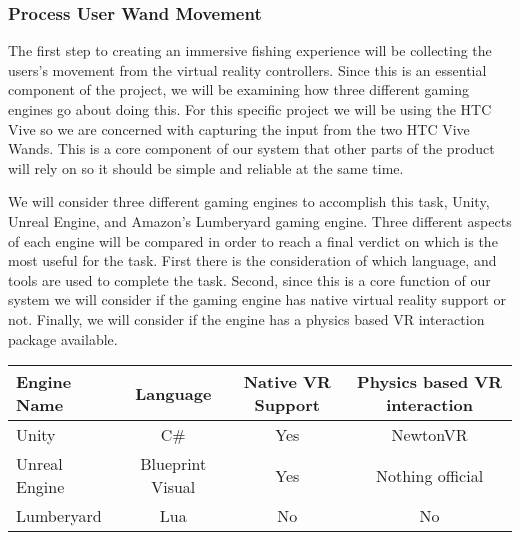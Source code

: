 \documentclass[10pt,journal,compsoc,onecolumn, draftclsnofoot]{IEEEtran}
\begin{document}
\subsubsection{Process User Wand Movement}
The first step to creating an immersive fishing experience will be collecting the users's movement from the virtual reality controllers.
Since this is an essential component of the project, we will be examining how three different gaming engines go about doing this.
For this specific project we will be using the HTC Vive so we are concerned with capturing the input from the two HTC Vive Wands.
This is a core component of our system that other parts of the product will rely on so it should be simple and reliable at the same time.

We will consider three different gaming engines to accomplish this task, Unity, Unreal Engine, and Amazon's Lumberyard gaming engine.
Three different aspects of each engine will be compared in order to reach a final verdict on which is the most useful for the task.
First there is the consideration of which language, and tools are used to complete the task.
Second, since this is a core function of our system we will consider if the gaming engine has native virtual reality support or not.
Finally, we will consider if the engine has a physics based VR interaction package available.

\vspace{2mm}
\begin{table}[h!]
\centering
  \begin{tabular}{ | l || c | c | c |  }
  \hline
  Engine Name & Language & Native VR Support & Physics based VR interaction\\
  \hline
  Unity  & C\# & Yes & NewtonVR\\ \hline
  Unreal Engine & Blueprint Visual & Yes & Nothing official\\ \hline
  Lumberyard & Lua & No & No\\ \hline
  \end{tabular}
\end{table}
\vspace{2mm}
\end{document}
